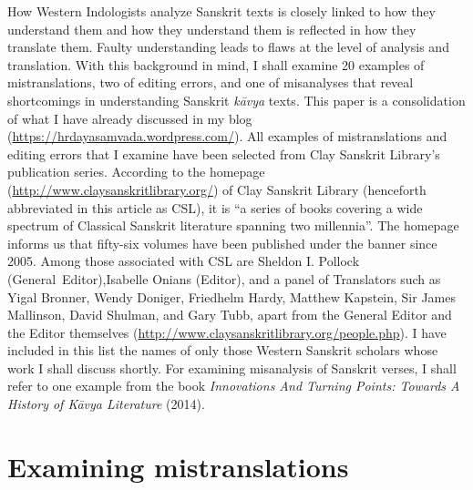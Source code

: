 How Western Indologists analyze Sanskrit texts is closely linked to how they understand them and how they understand them is reflected in how they translate them. Faulty understanding leads to flaws at the level of analysis and translation. With this background in mind, I shall examine 20 examples of mistranslations, two of editing errors, and one of misanalyses that reveal shortcomings in understanding Sanskrit \textsl{kāvya} texts. This paper is a consolidation of what I have already discussed in my blog (\url{https://hrdayasamvada.wordpress.com/}). All examples of mistranslations and editing errors that I examine have been selected from Clay Sanskrit Library's publication series. According to the homepage (\url{http://www.claysanskritlibrary.org/}) of Clay Sanskrit Library (henceforth abbreviated in this article as CSL), it is “a series of books covering a wide spectrum of Classical Sanskrit literature spanning two millennia”. The homepage informs us that fifty-six volumes have been published under the banner since 2005. Among those associated with CSL are Sheldon I. Pollock \hbox{(General Editor)},\break \hbox{Isabelle} Onians (Editor), and a panel of Translators such as Yigal Bronner, Wendy Doniger, Friedhelm Hardy, Matthew Kapstein, Sir James Mallinson, David Shulman, and Gary Tubb, apart from the General Editor and the Editor themselves (\url{http://www.claysanskritlibrary.org/people.php}). I have included in this list the names of only those Western Sanskrit scholars whose work I shall discuss shortly. For examining misanalysis of Sanskrit verses, I shall refer to one example from the book \textsl{Innovations And Turning Points: Towards A History of Kāvya Literature} (2014).\\[-21pt]

\section*{Examining mistranslations}

